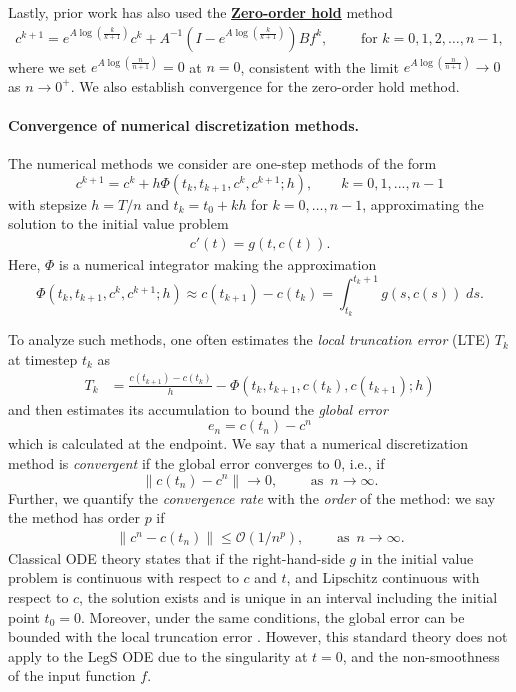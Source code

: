 \documentclass{article}
\theoremstyle{definition}
\newcommand{\pr}[1]{ \left( #1 \right) }
\begin{document}
Lastly, prior work has also used the \textbf{\underline{Zero-order hold}} method
\begin{align*}
    c^{k+1} = e^{A\log\pr{\frac{k}{k+1}}}c^k + A^{-1} \pr{I - e^{A \log \pr{\frac{k}{k+1}}}}B f^k, \qquad\text{ for }k=0,1,2,\dots,n-1,
\end{align*}
where we set $e^{A\log\pr{\frac{n}{n+1}}}=0$ at $n=0$, consistent with the limit $e^{A\log\pr{\frac{n}{n+1}}}\rightarrow 0$ as $n\rightarrow 0^+$.
We also establish convergence for the zero-order hold method.


\paragraph{Convergence of numerical discretization methods.} 
The numerical methods we consider are one-step methods of the form
\[
c^{k+1} = c^k + h\Phi(t_k, t_{k+1}, c^k, c^{k+1}; h), \qquad k=0,1,...,n-1
\]
with stepsize $h  =  T/n$ and $t_k=t_0+kh$ for $k=0,\dots,n-1$, approximating the solution to the initial value problem
\begin{align*} 
    c'(t) = g(t,c(t)). 
\end{align*}
Here, $\Phi$ is a numerical integrator making the approximation
\[
\Phi(t_k, t_{k+1}, c^k, c^{k+1}; h)\approx c(t_{k+1})-c(t_k)= \int^{t_k+1}_{t_k}g(s,c(s))\;ds.
\]

To analyze such methods, one often estimates the \emph{local truncation error} (LTE) $T_k$ at timestep $t_k$ as
\begin{align*}
T_k 
&= \frac{c(t_{k+1}) - c(t_k)}{h} - \Phi(t_k, t_{k+1}, c(t_k), c(t_{k+1}); h)
\end{align*}
and then estimates its accumulation to bound the \emph{global error}
\[
e_n = c(t_n) - c^n
\]
which is calculated at the endpoint.
We say that a numerical discretization method is \emph{convergent} if the global error converges to $0$, i.e., if
\[
\|c(t_n) - c^n\|\rightarrow 0,\qquad\text{ as }\,n\rightarrow\infty.
\]
Further, we quantify the \emph{convergence rate} with the \emph{order} of the method: we say the method has order $p$ if 
\begin{align*}
    \| c^n - c(t_n) \| \leq \mathcal{O}\pr{1/n^p},\qquad\text{ as }\,n\rightarrow\infty.
\end{align*}
Classical ODE theory states that if the right-hand-side $g$ in the initial value problem is continuous with respect to $c$ and $t$, and Lipschitz continuous with respect to $c$, the solution exists and is unique in an interval including the initial point $t_0=0$. Moreover, under the same conditions, the global error can be bounded with the local truncation error \citep{ascher_petzold_1998,Süli_Mayers_2003}. However, this standard theory does not apply to the LegS ODE due to the singularity at $t=0$, and the non-smoothness of the input function $f$.
\end{document}

